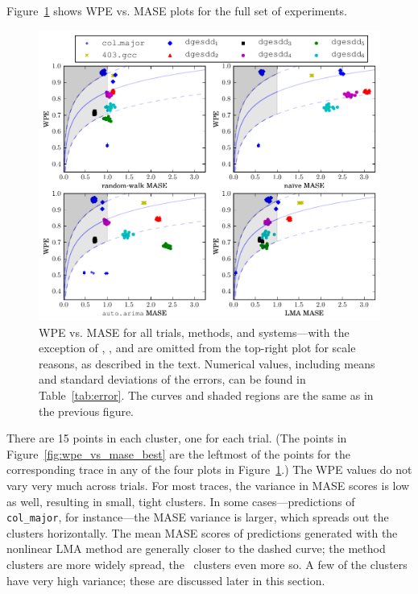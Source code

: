 Figure~\ref{fig:wpe_vs_mase_all} shows WPE vs. MASE plots for the full
set of experiments.
\begin{figure}
  \centering
  \includegraphics[width=1.7\columnwidth]{figs/new_predictions_vs_entropy4a}
\caption{WPE vs. MASE for all trials, methods, and systems---with the
  exception of \svdone, \svdthree, and \svdfive are omitted from the
  top-right plot for scale reasons, as described in the text.
%
%
Numerical values, including means and standard deviations of the
errors, can be found in Table~\ref{tab:error}.  The curves and shaded
regions are the same as in the previous figure.  }
    \label{fig:wpe_vs_mase_all}
\end{figure}
There are 15 points in each cluster, one for each trial.  (The points
in Figure~\ref{fig:wpe_vs_mase_best} are the leftmost of the points
for the corresponding trace in any of the four plots in
Figure~\ref{fig:wpe_vs_mase_all}.)  The WPE values do not vary very
much across trials.  For most traces, the variance in MASE scores is
low as well, resulting in small, tight clusters.  In some
cases---\arima predictions of {\tt col\_major}, for instance---the
MASE variance is larger, which spreads out the clusters horizontally.
The mean MASE scores of predictions generated with the nonlinear LMA
method are generally closer to the dashed curve; the \arima method
clusters are more widely spread, the \naive ~clusters even more so.  A
few of the clusters have very high variance; these are discussed later
in this section.

